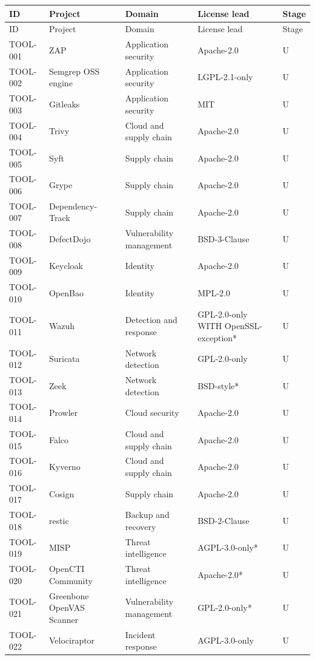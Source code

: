 \documentclass[11pt,oneside]{report}
\begin{document}
\footnotesize
\begin{longtable}{P{0.10\textwidth}P{0.32\textwidth}P{0.22\textwidth}P{0.155\textwidth}P{0.055\textwidth}}
\toprule ID & Project & Domain & License lead & Stage\\\midrule\endfirsthead
\toprule ID & Project & Domain & License lead & Stage\\\midrule\endhead

TOOL-001 & ZAP & Application security & Apache-2.0 & U \\
TOOL-002 & Semgrep OSS engine & Application security & LGPL-2.1-only & U \\
TOOL-003 & Gitleaks & Application security & MIT & U \\
TOOL-004 & Trivy & Cloud and supply chain & Apache-2.0 & U \\
TOOL-005 & Syft & Supply chain & Apache-2.0 & U \\
TOOL-006 & Grype & Supply chain & Apache-2.0 & U \\
TOOL-007 & Dependency-Track & Supply chain & Apache-2.0 & U \\
TOOL-008 & DefectDojo & Vulnerability management & BSD-3-Clause & U \\
TOOL-009 & Keycloak & Identity & Apache-2.0 & U \\
TOOL-010 & OpenBao & Identity & MPL-2.0 & U \\
TOOL-011 & Wazuh & Detection and response & GPL-2.0-only WITH OpenSSL-exception* & U \\
TOOL-012 & Suricata & Network detection & GPL-2.0-only & U \\
TOOL-013 & Zeek & Network detection & BSD-style* & U \\
TOOL-014 & Prowler & Cloud security & Apache-2.0 & U \\
TOOL-015 & Falco & Cloud and supply chain & Apache-2.0 & U \\
TOOL-016 & Kyverno & Cloud and supply chain & Apache-2.0 & U \\
TOOL-017 & Cosign & Supply chain & Apache-2.0 & U \\
TOOL-018 & restic & Backup and recovery & BSD-2-Clause & U \\
TOOL-019 & MISP & Threat intelligence & AGPL-3.0-only* & U \\
TOOL-020 & OpenCTI Community & Threat intelligence & Apache-2.0* & U \\
TOOL-021 & Greenbone OpenVAS Scanner & Vulnerability management & GPL-2.0-only* & U \\
TOOL-022 & Velociraptor & Incident response & AGPL-3.0-only & U \\

\end{longtable}
\end{document}
